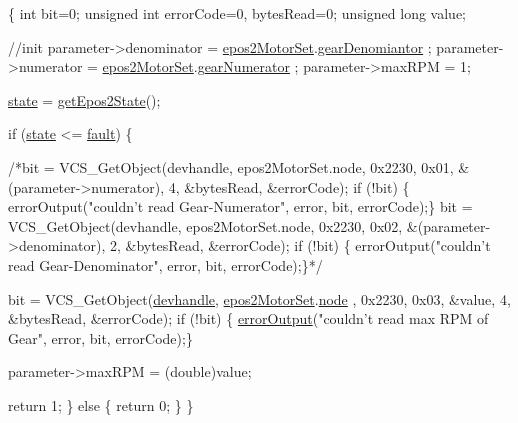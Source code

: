 \begin{DoxyCode}
\{
    \textcolor{keywordtype}{int} bit=0;
    \textcolor{keywordtype}{unsigned} \textcolor{keywordtype}{int} errorCode=0, bytesRead=0;
    \textcolor{keywordtype}{unsigned} \textcolor{keywordtype}{long} value;

    \textcolor{comment}{//init}
    parameter->denominator = \hyperlink{classEpos2MotorController_a0856f5fdd71ffa3b84a536afa085bfb1}{epos2MotorSet}.\hyperlink{structEpos2MotorController_1_1epos2Settings_af648530b886ebd8176997645c99aa35b}{gearDenomiantor}
      ;
    parameter->numerator = \hyperlink{classEpos2MotorController_a0856f5fdd71ffa3b84a536afa085bfb1}{epos2MotorSet}.\hyperlink{structEpos2MotorController_1_1epos2Settings_a1524dd1ea0ca97addfa48ec2ba983c3e}{gearNumerator}
      ;
    parameter->maxRPM = 1;

    \hyperlink{classEpos2MotorController_a7194b8efd4f2fd5a4d64b10135c416e2}{state} = \hyperlink{classEpos2MotorController_ac6c31e0dc57485aa817431b22627fc70}{getEpos2State}();

    \textcolor{keywordflow}{if} (\hyperlink{classEpos2MotorController_a7194b8efd4f2fd5a4d64b10135c416e2}{state} <= \hyperlink{classEpos2MotorController_ab5ec630dfbb90ad674e311187926060ca9c2b33ebbe5a72ad6d09d6af6531237c}{fault}) \{

        \textcolor{comment}{/*bit = VCS\_GetObject(devhandle, epos2MotorSet.node, 0x2230, 0x01,
       &(parameter->numerator), 4, &bytesRead, &errorCode);}
\textcolor{comment}{        if (!bit) \{ errorOutput("couldn't read Gear-Numerator", error, bit,
       errorCode);\}}
\textcolor{comment}{}
\textcolor{comment}{        bit = VCS\_GetObject(devhandle, epos2MotorSet.node, 0x2230, 0x02,
       &(parameter->denominator), 2, &bytesRead, &errorCode);}
\textcolor{comment}{        if (!bit) \{ errorOutput("couldn't read Gear-Denominator", error, bit,
       errorCode);\}*/}

        bit = VCS\_GetObject(\hyperlink{classEpos2MotorController_a40594faab444bcba221ab9d55d1162cd}{devhandle}, \hyperlink{classEpos2MotorController_a0856f5fdd71ffa3b84a536afa085bfb1}{epos2MotorSet}.\hyperlink{structEpos2MotorController_1_1epos2Settings_ab8f18d3df17e8de9ed5250a3e53292c6}{node}
      , 0x2230, 0x03, &value, 4, &bytesRead, &errorCode);
        \textcolor{keywordflow}{if} (!bit) \{ \hyperlink{classEpos2MotorController_a64d5e3e3858597c111e60ba8b382a63b}{errorOutput}(\textcolor{stringliteral}{"couldn't read max RPM of Gear"}, 
      error, bit, errorCode);\}

        parameter->maxRPM = (double)value;

        \textcolor{keywordflow}{return} 1;
    \} \textcolor{keywordflow}{else} \{
        \textcolor{keywordflow}{return} 0;
    \}
\}
\end{DoxyCode}
